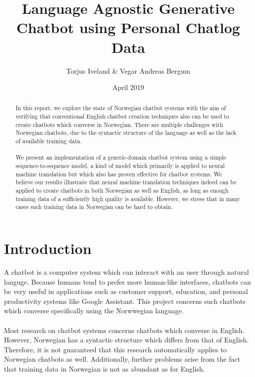 \documentclass{article}
\title{Language Agnostic Generative Chatbot using Personal Chatlog Data}
\author{Torjus Iveland \& Vegar Andreas Bergum}
\date{April 2019}
\begin{document}
\maketitle

\begin{abstract}

In this report, we explore the state of Norwegian chatbot systems with
the aim of verifying that conventional English chatbot creation techniques
also can be used to create chatbots which converse in Norwegian. There are
multiple challenges with Norwegian chatbots, due to the syntactic structure
of the language as well as the lack of available training data.

\paragraph{}
We present an implementation of a generic-domain chatbot system using a simple
sequence-to-sequence model, a kind of model which primarily is applied to
neural machine translation but which also has proven effective for chatbot
systems. We believe our results illustrate that neural machine translation
techniques indeed can be applied to create chatbots in both Norwegian as
well as English, as long as enough training data of a sufficiently high
quality is available. However, we stress that in many cases such training
data in Norwegian can be hard to obtain.

\end{abstract}

\section{Introduction}

A chatbot is a computer system which can interact with an user through natural
languge. Because humans tend to prefer more human-like interfaces, chatbots can
be very useful in applications
such as customer support, education, and personal productivity systems like
Google Assistant.  This project concerns such chatbots which converse
specifically using the Norwwegian language.

\paragraph{}
Most research on chatbot systems concerns chatbots which converse in English.
However, Norwegian has a syntactic structure which differs from that of
English. Therefore, it is not guaranteed that this research automatically
applies to Norwegian chatbots as well. Additionally, further problems arise
from the fact that training data in Norwegian is not as abundant as for
English.
\end{document}

